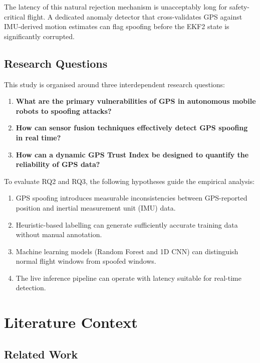 \documentclass[11pt,a4paper]{article}
\begin{document}
The latency of this natural rejection mechanism is unacceptably long for safety-critical flight. A dedicated anomaly detector that cross-validates GPS against IMU-derived motion estimates can flag spoofing before the EKF2 state is significantly corrupted.

\subsection{Research Questions}

This study is organised around three interdependent research questions:

\begin{enumerate}[label=\textbf{RQ\arabic*:},leftmargin=3em]
    \item \textbf{What are the primary vulnerabilities of GPS in autonomous mobile robots to spoofing attacks?}
    \item \textbf{How can sensor fusion techniques effectively detect GPS spoofing in real time?}
    \item \textbf{How can a dynamic GPS Trust Index be designed to quantify the reliability of GPS data?}
\end{enumerate}

\noindent
To evaluate RQ2 and RQ3, the following hypotheses guide the empirical analysis:
\begin{enumerate}[label=H\arabic*:,leftmargin=2em]
    \item GPS spoofing introduces measurable inconsistencies between GPS-reported position and inertial measurement unit (IMU) data.
    \item Heuristic-based labelling can generate sufficiently accurate training data without manual annotation.
    \item Machine learning models (Random Forest and 1D CNN) can distinguish normal flight windows from spoofed windows.
    \item The live inference pipeline can operate with latency suitable for real-time detection.
\end{enumerate}

\section{Literature Context}

\subsection{Related Work}
\end{document}

